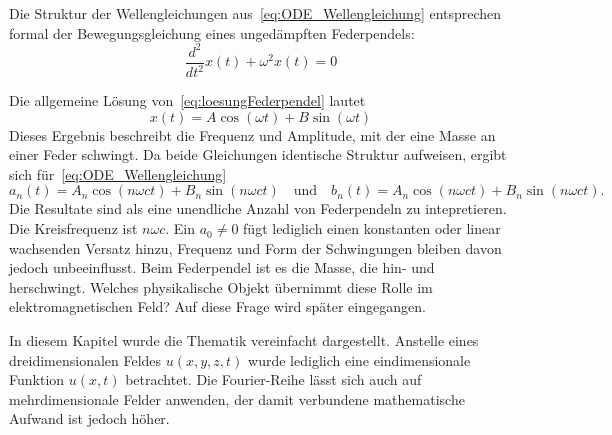 Die Struktur der Wellengleichungen aus~\eqref{eq:ODE_Wellengleichung} entsprechen formal der Bewegungsgleichung eines ungedämpften Federpendels: 
\begin{equation}\label{eq:loesungFederpendel}
	\frac{d^2}{dt^2}x(t) + \omega^2 x(t) = 0
\end{equation}

Die allgemeine Lösung von~\eqref{eq:loesungFederpendel} lautet  
\begin{equation}
	x(t) = A \cos(\omega t) + B \sin(\omega t)
\end{equation}
Dieses Ergebnis beschreibt die Frequenz und Amplitude, mit der eine Masse an einer Feder schwingt.  
Da beide Gleichungen identische Struktur aufweisen, ergibt sich für~\eqref{eq:ODE_Wellengleichung} 
\begin{equation}
	a_n(t) = A_n \cos(n \omega c t) + B_n \sin(n \omega c t)
	\quad\text{und}\quad
	b_n(t) = A_n \cos(n \omega c t) + B_n \sin(n \omega c t).
\end{equation}
Die Resultate sind als eine unendliche Anzahl von Federpendeln zu intepretieren.
Die Kreisfrequenz ist $n \omega c$. 
Ein $a_0\neq0$ fügt lediglich einen konstanten oder linear wachsenden Versatz hinzu, Frequenz und Form der Schwingungen bleiben davon jedoch unbeeinflusst.
Beim Federpendel ist es die Masse, die hin- und herschwingt.
Welches physikalische Objekt übernimmt diese Rolle im elektromagnetischen Feld? 
Auf diese Frage wird später eingegangen.

In diesem Kapitel wurde die Thematik vereinfacht dargestellt. 
Anstelle eines dreidimensionalen Feldes $u(x,y,z,t)$ wurde lediglich eine eindimensionale Funktion $u(x,t)$ betrachtet. Die Fourier-Reihe lässt sich auch auf mehrdimensionale Felder anwenden, der damit verbundene mathematische Aufwand ist jedoch höher. 








